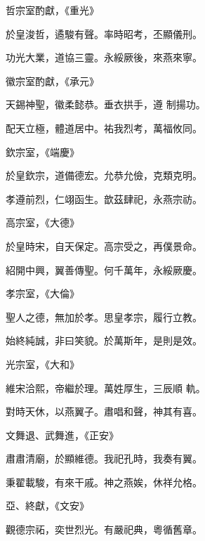 \begin{pinyinscope}
 哲宗室酌獻，《重光》



 於皇浚哲，遹駿有聲。率時昭考，丕顯儀刑。



 功光大業，道協三靈。永綏厥後，來燕來寧。



 徽宗室酌獻，《承元》



 天錫神聖，徽柔懿恭。垂衣拱手，遵
 制揚功。



 配天立極，體道居中。祐我烈考，萬福攸同。



 欽宗室，《端慶》



 於皇欽宗，道備德宏。允恭允儉，克類克明。



 孝遵前烈，仁翊函生。歆茲肆祀，永燕宗祊。



 高宗室，《大德》



 於皇時宋，自天保定。高宗受之，再僕景命。



 紹開中興，翼善傳聖。何千萬年，永綏厥慶。



 孝宗室，《大倫》



 聖人之德，無加於孝。思皇孝宗，履行立教。



 始終純誠，非曰笑貌。於萬斯年，是則是效。



 光宗室，《大和》



 維宋洽熙，帝繼於理。萬姓厚生，三辰順
 軌。



 對時天休，以燕翼子。肅唱和聲，神其有喜。



 文舞退、武舞進，《正安》



 肅肅清廟，於顯維德。我祀孔時，我奏有翼。



 秉翟載駿，有來干戚。神之燕娭，休祥允格。



 亞、終獻，《文安》



 觀德宗祏，奕世烈光。有嚴祀典，粵循舊章。




\end{pinyinscope}

